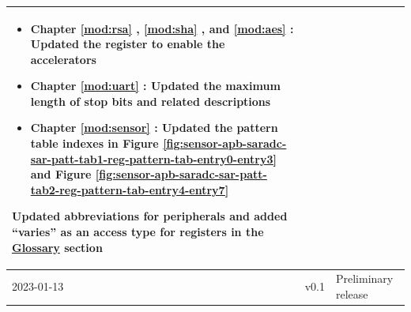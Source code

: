 \begin{longtable}[l]{ | m{2cm} | m{1.5cm} | m{12cm} | }
\begin{itemize}
            \item Chapter \ref{mod:rsa} \textit{\nameref{mod:rsa}}, \ref{mod:sha} \textit{\nameref{mod:sha}}, and \ref{mod:aes} \textit{\nameref{mod:aes}}: Updated the register to enable the accelerators  %
            \item Chapter \ref{mod:uart} \textit{\nameref{mod:uart}}: Updated the maximum length of stop bits and related descriptions %
            \item Chapter \ref{mod:sensor} \textit{\nameref{mod:sensor}}: Updated the pattern table indexes in Figure \ref{fig:sensor-apb-saradc-sar-patt-tab1-reg-pattern-tab-entry0-entry3} and Figure \ref{fig:sensor-apb-saradc-sar-patt-tab2-reg-pattern-tab-entry4-entry7}
        \end{itemize}
        Updated abbreviations for peripherals and added “varies” as an access type for registers in the \hyperref[glossary]{Glossary} section
        \\\hline
    2023-01-13 & v0.1 & Preliminary release \\\hline
\end{longtable}
